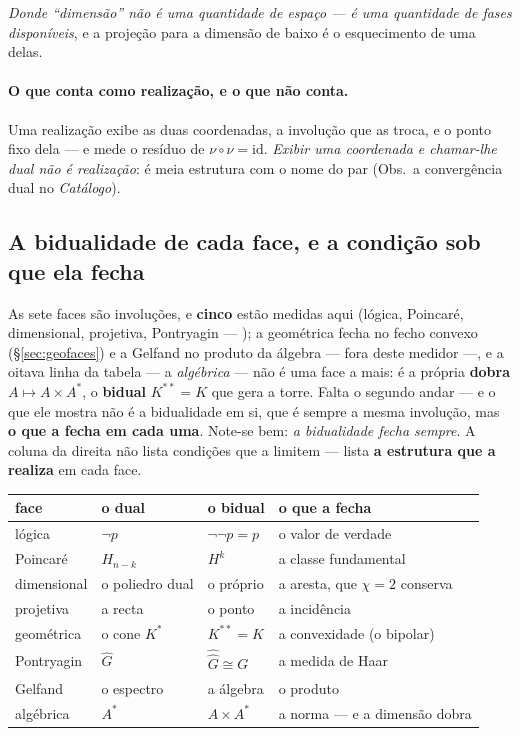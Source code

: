 \documentclass[livro.tex]{subfiles}
\begin{document}
\noindent \emph{Donde ``dimensão'' não é uma quantidade de espaço --- é uma quantidade de fases
disponíveis}, e a projeção para a dimensão de baixo é o esquecimento de uma delas.

\paragraph{O que conta como realização, e o que não conta.} Uma realização exibe as duas
coordenadas, a involução que as troca, e o ponto fixo dela --- e mede o resíduo de
$\nu\circ\nu=\mathrm{id}$. \emph{Exibir uma coordenada e chamar-lhe dual não é realização}: é meia
estrutura com o nome do par (Obs.~a convergência dual no \emph{Catálogo}).

\subsection{A bidualidade de cada face, e a condição sob que ela fecha}\label{sec:bidualfaces}

As sete faces são involuções, e \textbf{cinco} estão medidas aqui (lógica, Poincaré, dimensional,
projetiva, Pontryagin --- ); a geométrica fecha no fecho convexo (\S\ref{sec:geofaces})
e a Gelfand no produto da álgebra --- fora deste medidor ---,
e a oitava linha da tabela --- a \emph{algébrica} --- não é uma face a mais: é a própria \textbf{dobra}
$A\mapsto A\times A^{*}$, o \textbf{bidual} $K^{**}=K$ que gera a torre. Falta o segundo andar --- e o que
ele mostra não é a bidualidade em si, que é sempre a mesma involução, mas \textbf{o que a fecha em cada uma}. Note-se
bem: \emph{a bidualidade fecha sempre}. A coluna da direita não lista condições que a limitem ---
lista \textbf{a estrutura que a realiza} em cada face.

\begin{center}\small
\begin{tabular}{@{}llll@{}}
\toprule
face & o dual & o bidual & \textbf{o que a fecha} \\
\midrule
lógica       & $\neg p$              & $\neg\neg p=p$          & o valor de verdade \\
Poincaré     & $H_{n-k}$             & $H^{k}$                 & a classe fundamental \\
dimensional  & o poliedro dual       & o próprio               & a aresta, que $\chi=2$ conserva \\
projetiva    & a recta               & o ponto                 & a incidência \\
geométrica   & o cone $K^{*}$        & $K^{**}=K$              & a convexidade (o bipolar) \\
Pontryagin   & $\widehat G$          & $\widehat{\widehat G}\cong G$ & a medida de Haar \\
Gelfand      & o espectro            & a álgebra               & o produto \\
algébrica    & $A^{*}$               & $A\times A^{*}$         & a norma --- e a dimensão dobra \\
\bottomrule
\end{tabular}
\end{center}
\end{document}

